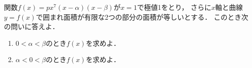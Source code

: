\documentclass[../../main.tex]{subfiles}
\begin{document}
関数$f(x)=px^7(x-\alpha)(x-\beta)$が$x=1$で極値1をとり，
さらに$x$軸と曲線$y=f(x)$で囲まれ面積が有限な2つの部分の面積が等しいとする．
このとき次の問いに答えよ．
\begin{enumerate}
  \item $0<\alpha<\beta$のとき$f(x)$を求めよ．
  \item $\alpha<0<\beta$のとき$f(x)$を求めよ．
\end{enumerate}
\end{document}
